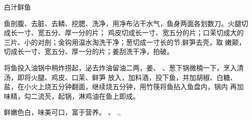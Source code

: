 \begin{recipe}{白汁鲜鱼}

\ingredients



\cooking

\step 鱼剖腹、去脏、去鳞、挖腮、洗净，用净布沾干水气，鱼身两面各划数刀。火腿切成长一寸、宽五分、厚一分的片；
鸡皮切成长一寸、宽五分的片；口茉切成大的三片、小的对剖；金钩用温水淘洗干净；葱切成一寸长的节;鲜笋去壳，取 嫩颠，切成长一寸、宽五分、厚一分的片；姜刮洗干净，拍破。

\step 将鱼投入油锅中稍炸捞起，泌去炸油留油二两，姜、
、葱下锅微楠一下，烹入清汤，即将火腿、鸡皮、口茉、鲜笋
放入，加料酒，投下鱼，并加胡椒、白糖、盐，在小火上烧五分钟翻面，继续烧五分钟，用竹筷将鱼拈入鱼盘内，锅内
再加味精，勾二流芡，起锅，淋鸡油在鱼上即成。

\notes

鲜嫩色白，味美可口，富于营养。	、	,,

\end{recipe}

